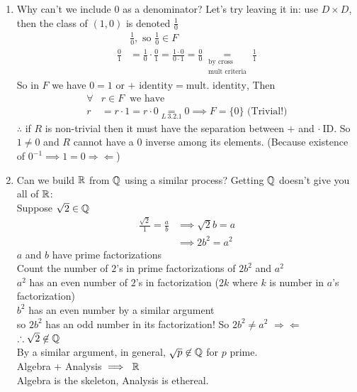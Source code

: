 \begin{enumerate}
    \item Why can't we include $0$ as a denominator? Let's try leaving it in: use $D\times D$, then
    the class of $(1,0)$ is denoted $\frac{1}{0}$
    \begin{align}
        &\frac{1}{0}, \text{ so }\frac{1}{0}\in F \nonumber \\
        \frac{0}{1} &= \frac{1}{0}\cdot \frac{0}{1} = \frac{1\cdot 0}{0\cdot 1} = \frac{0}{0} \underset{\substack{\text{by cross} \\ \text{mult criteria}}}{=}\frac{1}{1} \nonumber
    \end{align}
    So in $F$ we have $0=1$ or $+ \text{ identity}=\text{mult. identity}$, Then
    \begin{align}
        \forall &r \in F \ \text{ we have} \nonumber \\
        r &= r\cdot 1 = r\cdot 0 \underset{L \ 3.2.1}{=} 0 \implies F = \{0\} \text{ \ \ \  (Trivial!)} \nonumber
    \end{align}
    $\therefore$ if $R$ is non-trivial then it must have the separation between $+$ and
    $\cdot \ \text{ID}$. So $1\neq 0$ and $R$ cannot have a $0$ inverse among its elements. (Because
    existence of $0^{-1} \implies 1=0 \Rightarrow \Leftarrow$)
    \item Can we build ${\mathbb{R}}$ from ${\mathbb{Q}}$ using a similar process? Getting ${\mathbb{Q}}$ doesn't give you all of
    ${\mathbb{R}}$: \\ \steezybreak
    Suppose $\sqrt{2} \in {\mathbb{Q}}$
    \begin{align}
        \frac{\sqrt{2}}{1}=\frac{a}{b} &\implies \sqrt{2}b=a \nonumber \\
        &\implies 2b^2 = a^2 \nonumber
    \end{align}
    $a$ and $b$ have prime factorizations \\
    Count the number of $2$'s in prime factorizations of $2b^2$ and $a^2$ \\
    $a^2$ has an even number of $2$'s in factorization ($2k$ where $k$ is number in $a$'s
    factorization) \\
    $b^2$ has an even number by a similar argument \\
    so $2b^2$ has an odd number in its factorization! So $2b^2 \neq a^2$ $\Rightarrow \Leftarrow$ \\
    $\therefore \sqrt{2} \not \in {\mathbb{Q}}$ \\
    By a similar argument, in general, $\sqrt{p} \not \in {\mathbb{Q}}$ for $p$ prime. \\
    Algebra $+$ Analysis $\implies \ {\mathbb{R}} $ \\
    Algebra is the skeleton, Analysis is ethereal.
\end{enumerate}

